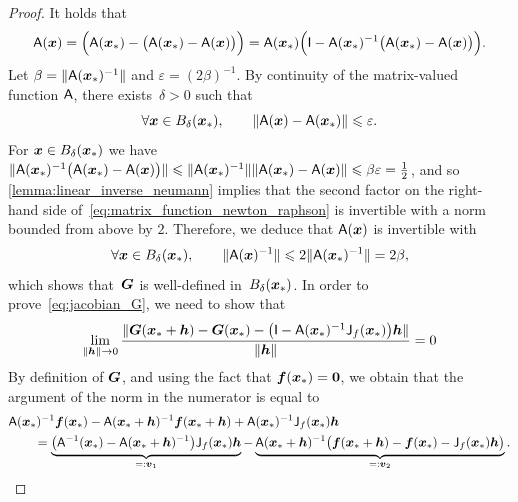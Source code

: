 \begin{proof}
    It holds that
    \begin{equation}
        \label{eq:matrix_function_newton_raphson}
        \mathsf A(\mathbf{\boldsymbol{x}})
        = \Bigl(\mathsf A(\mathbf{\boldsymbol{x}}_*) - \bigl(\mathsf A(\mathbf{\boldsymbol{x}}_*) - \mathsf A(\mathbf{\boldsymbol{x}})\bigr)\Bigr)
        = \mathsf A(\mathbf{\boldsymbol{x}}_*) \Bigl(\mathsf I - \mathsf A(\mathbf{\boldsymbol{x}}_*)^{-1} \bigl(\mathsf A(\mathbf{\boldsymbol{x}}_*) - \mathsf A(\mathbf{\boldsymbol{x}})\bigr)\Bigr).
    \end{equation}
    Let $\beta = \lVert\mathsf A(\mathbf{\boldsymbol{x}}_*)^{-1}\rVert$ and $\varepsilon = (2 \beta)^{-1}$.
    By continuity of the matrix-valued function $\mathsf A$,
    there exists~$\delta > 0$ such that
    \[
        \forall \mathbf{\boldsymbol{x}} \in B_{\delta}(\mathbf{\boldsymbol{x}}_*), \qquad
        \lVert\mathsf A(\mathbf{\boldsymbol{x}}) - \mathsf A(\mathbf{\boldsymbol{x}}_*)\rVert \leqslant \varepsilon.
    \]
    For $\mathbf{\boldsymbol{x}} \in B_{\delta}(\mathbf{\boldsymbol{x}}_*)$ we have $\lVert\mathsf A(\mathbf{\boldsymbol{x}}_*)^{-1} \bigl(\mathsf A(\mathbf{\boldsymbol{x}}_*) - \mathsf A(\mathbf{\boldsymbol{x}})\bigr)\rVert \leqslant \lVert\mathsf A(\mathbf{\boldsymbol{x}}_*)^{-1}\rVert \lVert\mathsf A(\mathbf{\boldsymbol{x}}_*) - \mathsf A(\mathbf{\boldsymbol{x}})\rVert \leqslant \beta \varepsilon = \frac{1}{2}$,
    and so \cref{lemma:linear_inverse_neumann} implies that the second factor
    on the right-hand side of~\eqref{eq:matrix_function_newton_raphson} is invertible with a norm bounded from above by $2$.
    Therefore, we deduce that $\mathsf A(\mathbf{\boldsymbol{x}})$ is invertible with
    \begin{equation}
        \label{eq:inverse_newton_raphson}
        \forall \mathbf{\boldsymbol{x}} \in B_{\delta}(\mathbf{\boldsymbol{x}}_*), \qquad
        \lVert\mathsf A(\mathbf{\boldsymbol{x}})^{-1}\rVert \leqslant 2\lVert\mathsf A(\mathbf{\boldsymbol{x}}_*)^{-1}\rVert = 2 \beta,
    \end{equation}
    which shows that~$\mathbf{\boldsymbol{G}}$ is well-defined in~$B_{\delta}(\mathbf{\boldsymbol{x}}_*)$.
    In order to prove~\eqref{eq:jacobian_G},
    we need to show that
    \[
        \lim_{\norm{\vect h} \to 0} \frac{\norm[big]{\vect G(\vect x_* + \vect h) - \vect G(\vect x_*) - \bigl(\mat I - \mat A(\vect x_*)^{-1} \mat J_f(\vect x_*)\bigr) \vect h}}{\norm {\vect h}} = 0
    \]
    By definition of $\mathbf{\boldsymbol{G}}$,
    and using the fact that $\mathbf{\boldsymbol{f}}(\mathbf{\boldsymbol{x}}_*) = \mathbf{\boldsymbol{0}}$,
    we obtain that the argument of the norm in the numerator is equal to
    \begin{align*}
        &\mat A (\vect x_*)^{-1} \vect f(\vect x_*) - \mat A (\vect x_* + \vect h)^{-1} \vect f(\vect x_* + \vect h) + \mat A(\vect x_*)^{-1} \mat J_f(\vect x_*) \vect h \\
        &\qquad =
        \underbrace{\bigl( \mat A^{-1}(\vect x_*) - \mat A(\vect x_* + \vect h)^{-1} \bigr) \mat J_f(\vect x_*) \vect h}_{=: \vect v_1}
        - \underbrace{\mat A (\vect x_* + \vect h)^{-1} \bigl( \vect f(\vect x_* + \vect h) - \vect f(\vect x_*) - \mat J_f(\vect x_*) \vect h\bigr)}_{=: \vect v_2}.

\end{align*}
\end{proof}
